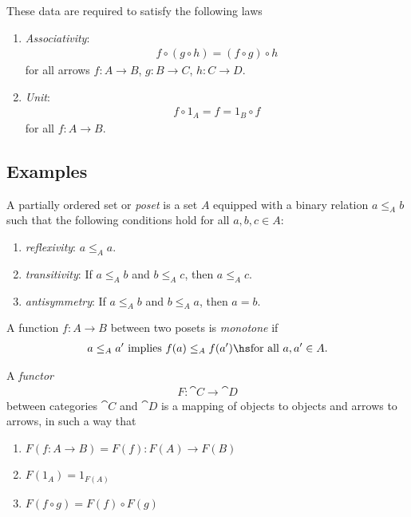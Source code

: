 \documentclass{article}
\begin{document}
\begin{definition}
    These data are required to satisfy the following laws \begin{enumerate}[label=C\arabic*.]
        \item \emph{Associativity}: \begin{align*}
                  f \circ (g \circ h) = (f\circ g) \circ h
              \end{align*}
              for all arrows $f:A\to B$, $g:B\to C$, $h:C\to D$.
        \item \emph{Unit}: \begin{align*}
                  f \circ 1_A = f = 1_B \circ f
              \end{align*}
              for all $f:A\to B$.
    \end{enumerate}
\end{definition}

\subsection{Examples}

\begin{definition}
    A partially ordered set or \emph{poset} is a set $A$ equipped
    with a binary relation $a\leq_A b$ such that the following conditions
    hold for all $a,b,c\in A$:
    \begin{enumerate}[label=P\arabic*.]
        \item \emph{reflexivity}: $a\leq_A a$.
        \item \emph{transitivity}: If $a\leq_A b$ and $b\leq_A c$, then $a\leq_A c$.
        \item \emph{antisymmetry}: If $a\leq_A b$ and $b\leq_A a$, then $a=b$.
    \end{enumerate}
    A function $f:A\to B$ between two posets is \emph{monotone} if
    \begin{align*}
        a \leq_A a' \text{ implies } f(a) \leq_A f(a')\hs \text{for all }a,a'\in A.
    \end{align*}
\end{definition}

\begin{definition}
    A \emph{functor}
    \begin{align*}
        F:\cat{C}\to\cat{D}
    \end{align*}
    between categories $\cat{C}$ and $\cat{D}$ is a mapping
    of objects to objects and arrows to arrows, in such a way that
    \begin{enumerate}[label=F\arabic*.]
        \item $F(f:A\to B)=F(f):F(A)\to F(B)$
        \item $F(1_A)=1_{F(A)}$
        \item $F(f\circ g)=F(f)\circ F(g)$
    \end{enumerate}
\end{definition}
\end{document}
